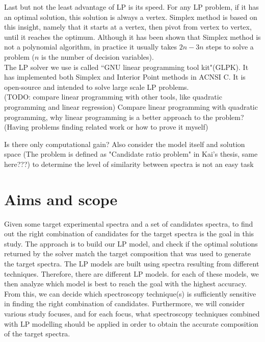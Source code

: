 Last but not the least advantage of LP is its speed. For any LP problem, if it has an optimal solution, this solution is always a vertex. Simplex method is based on this insight, namely that it starts at a vertex, then pivot from vertex to vertex, until it reaches the optimum. Although it has been shown that Simplex method is not a polynomial algorithm, in practice it usually takes $2n-3n$ steps to solve a problem ($n$ is the number of decision variables). \\

The LP solver we use is called ``GNU linear programming tool kit"(GLPK). It has implemented both Simplex and Interior Point methods in ACNSI C. It is open-source and intended to solve large scale LP problems. \\


(TODO: compare linear programming with other tools, like quadratic programming and linear regression)
Compare linear programming with quadratic programming, why linear programming is a better approach to the problem? (Having problems finding related work or how to prove it myself)
	
Is there only computational gain?
Also consider the model itself and solution space	
(The problem is defined as "Candidate ratio problem" in Kai's thesis, same here???)
to determine the level of similarity between spectra is not an easy task 
	
\section{Aims and scope}
Given some target experimental spectra and a set of candidates spectra, to find out the right combination of candidates for the target spectra is the goal in this study. The approach is to build our LP model, and check if the optimal solutions returned by the solver match the target composition that was used to generate the target spectra. The LP models are built using spectra resulting from different techniques. Therefore, there are different LP models. for each of these models, we then analyze which model is best to reach the goal with the highest accuracy. From this, we can decide which spectroscopy technique(s) is sufficiently sensitive in finding the right combination of candidates. Furthermore, we will consider various study focuses, and for each focus, what spectroscopy techniques combined with LP modelling should be applied in order to obtain the accurate composition of the target spectra. 